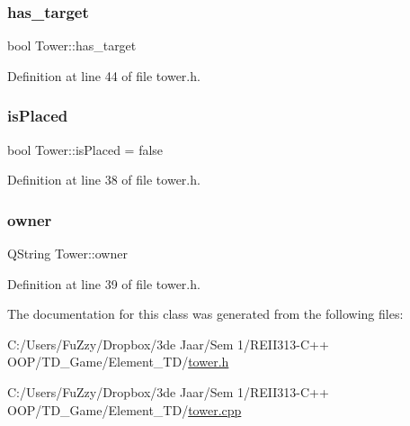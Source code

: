 \subsubsection{\texorpdfstring{has\+\_\+target}{has\_target}}
{\footnotesize\ttfamily bool Tower\+::has\+\_\+target\hspace{0.3cm}{\ttfamily [protected]}}



Definition at line 44 of file tower.\+h.

\mbox{\label{class_tower_a1317cf5400c63351e0d66b17df5c0417}} 
\subsubsection{\texorpdfstring{is\+Placed}{isPlaced}}
{\footnotesize\ttfamily bool Tower\+::is\+Placed = false\hspace{0.3cm}{\ttfamily [protected]}}



Definition at line 38 of file tower.\+h.

\mbox{\label{class_tower_abff7e8aaf637c17bcba08f9097db38df}} 
\subsubsection{\texorpdfstring{owner}{owner}}
{\footnotesize\ttfamily Q\+String Tower\+::owner\hspace{0.3cm}{\ttfamily [protected]}}



Definition at line 39 of file tower.\+h.



The documentation for this class was generated from the following files\+:\begin{DoxyCompactItemize}
\item 
C\+:/\+Users/\+Fu\+Zzy/\+Dropbox/3de Jaar/\+Sem 1/\+R\+E\+I\+I313-\/\+C++ O\+O\+P/\+T\+D\+\_\+\+Game/\+Element\+\_\+\+T\+D/\hyperlink{tower_8h}{tower.\+h}\item 
C\+:/\+Users/\+Fu\+Zzy/\+Dropbox/3de Jaar/\+Sem 1/\+R\+E\+I\+I313-\/\+C++ O\+O\+P/\+T\+D\+\_\+\+Game/\+Element\+\_\+\+T\+D/\hyperlink{tower_8cpp}{tower.\+cpp}\end{DoxyCompactItemize}

